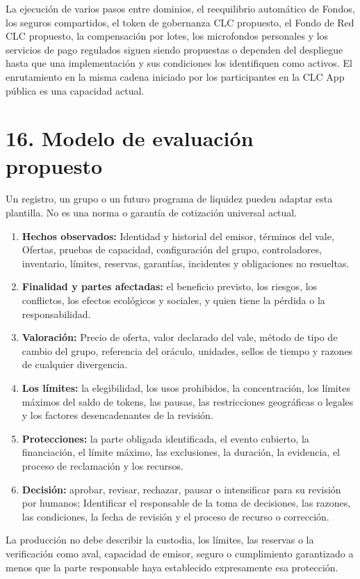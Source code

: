 \documentclass[11pt]{article}
\begin{document}
La ejecución de varios pasos entre dominios, el reequilibrio automático de Fondos, los seguros compartidos, el token de gobernanza CLC propuesto, el Fondo de Red CLC propuesto, la compensación por lotes, los microfondos personales y los servicios de pago regulados siguen siendo propuestas o dependen del despliegue hasta que una implementación y sus condiciones los identifiquen como activos. El enrutamiento en la misma cadena iniciado por los participantes en la CLC App pública es una capacidad actual.


\section*{16. Modelo de evaluación propuesto}

Un registro, un grupo o un futuro programa de liquidez pueden adaptar esta plantilla. No es una norma o garantía de cotización universal actual.

\begin{enumerate}[leftmargin=*]
\item \textbf{Hechos observados:} Identidad y historial del emisor, términos del vale, Ofertas, pruebas de capacidad, configuración del grupo, controladores, inventario, límites, reservas, garantías, incidentes y obligaciones no resueltas.
\item \textbf{Finalidad y partes afectadas:} el beneficio previsto, los riesgos, los conflictos, los efectos ecológicos y sociales, y quien tiene la pérdida o la responsabilidad.
\item \textbf{Valoración:} Precio de oferta, valor declarado del vale, método de tipo de cambio del grupo, referencia del oráculo, unidades, sellos de tiempo y razones de cualquier divergencia.
\item \textbf{Los límites:} la elegibilidad, los usos prohibidos, la concentración, los límites máximos del saldo de tokens, las pausas, las restricciones geográficas o legales y los factores desencadenantes de la revisión.
\item \textbf{Protecciones:} la parte obligada identificada, el evento cubierto, la financiación, el límite máximo, las exclusiones, la duración, la evidencia, el proceso de reclamación y los recursos.
\item \textbf{Decisión:} aprobar, revisar, rechazar, pausar o intensificar para su revisión por humanos; Identificar el responsable de la toma de decisiones, las razones, las condiciones, la fecha de revisión y el proceso de recurso o corrección.
\end{enumerate}
La producción no debe describir la custodia, los límites, las reservas o la verificación como aval, capacidad de emisor, seguro o cumplimiento garantizado a menos que la parte responsable haya establecido expresamente esa protección.
\end{document}
